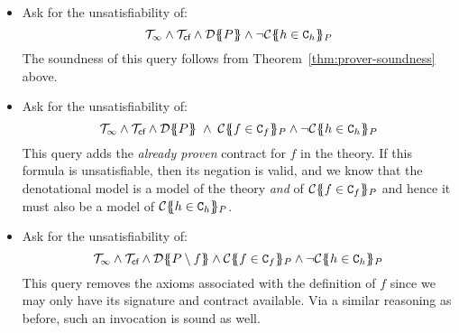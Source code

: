\begin{itemize}
  \item Ask for the unsatisfiability of: 
    \[  \Th_\infty \land \Th_\lcfZ \land \dtrans{}{P} \land \neg\ctrans{\Sigma}{P}{h \in \Ct_h} \]
        The soundness of this query follows from Theorem~\ref{thm:prover-soundness} above.

  \item Ask for the unsatisfiability of:
    \[  \Th_\infty \land \Th_\lcfZ \land 
        \dtrans{\Sigma}{P}\;\land\;\ctrans{\Sigma}{P}{f \in \Ct_f} \land \neg \ctrans{\Sigma}{P}{h \in \Ct_h} \]
        This query adds the {\em already proven} contract for $f$ in the theory. If this formula
        is unsatisfiable, then its negation is valid, and we know that the denotational model is 
        a model of the theory {\em and} of $\ctrans{\Sigma}{P}{f \in \Ct_f}$ and hence it must also
        be a model of $\ctrans{\Sigma}{P}{h \in \Ct_h}$.
  \item Ask for the unsatisfiability of:
    \[  \Th_\infty \land \Th_\lcfZ \land 
        \dtrans{\Sigma}{P \setminus f}\land\ctrans{\Sigma}{P}{f \in \Ct_f}\land
        \neg\ctrans{\Sigma}{P}{h \in \Ct_h} \]
        This query removes the axioms associated with the definition of $f$ since we may only have 
        its signature and contract available. Via a similar reasoning as before, such an invocation 
        is sound as well.
\end{itemize}



\clearpage
